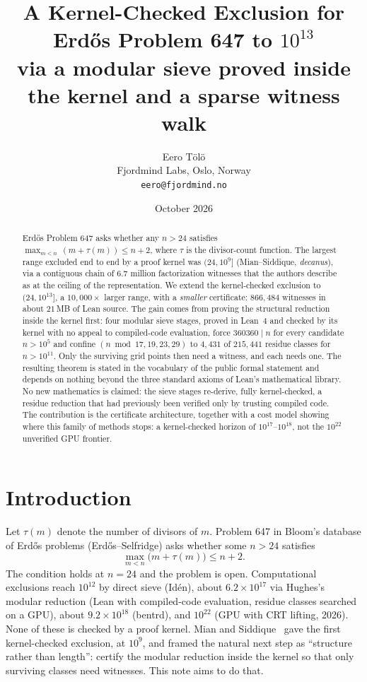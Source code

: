 \documentclass[11pt]{article}
\title{A Kernel-Checked Exclusion for Erd\H{o}s Problem 647 to $10^{13}$\\
\large via a modular sieve proved inside the kernel and a sparse witness walk}
\author{Eero T\"ol\"o\\ Fjordmind Labs, Oslo, Norway\\ \texttt{eero@fjordmind.no}}
\date{October 2026}
\begin{document}
\maketitle

\begin{abstract}
Erd\H{o}s Problem 647 asks whether any $n>24$ satisfies $\max_{m<n}\,(m+\tau(m))\le n+2$, where $\tau$ is the divisor-count function. The largest range excluded end to end by a proof kernel was $(24,10^{9}]$ (Mian--Siddique, \emph{decanus}), via a contiguous chain of $6.7$ million factorization witnesses that the authors describe as at the ceiling of the representation. We extend the kernel-checked exclusion to $(24,10^{13}]$, a $10{,}000\times$ larger range, with a \emph{smaller} certificate: $866{,}484$ witnesses in about $21$\,MB of Lean source. The gain comes from proving the structural reduction inside the kernel first: four modular sieve stages, proved in Lean~4 and checked by its kernel with no appeal to compiled-code evaluation, force $360360\mid n$ for every candidate $n>10^{5}$ and confine $(n \bmod 17,19,23,29)$ to $4{,}431$ of $215{,}441$ residue classes for $n>10^{11}$. Only the surviving grid points then need a witness, and each needs one. The resulting theorem is stated in the vocabulary of the public formal statement and depends on nothing beyond the three standard axioms of Lean's mathematical library. No new mathematics is claimed: the sieve stages re-derive, fully kernel-checked, a residue reduction that had previously been verified only by trusting compiled code. The contribution is the certificate architecture, together with a cost model showing where this family of methods stops: a kernel-checked horizon of $10^{17}$--$10^{18}$, not the $10^{22}$ unverified GPU frontier.
\end{abstract}

\section{Introduction}

Let $\tau(m)$ denote the number of divisors of $m$. Problem 647 in Bloom's database of Erd\H{o}s problems (Erd\H{o}s--Selfridge) asks whether some $n>24$ satisfies
\[
\max_{m<n}\bigl(m+\tau(m)\bigr)\le n+2 .
\]
The condition holds at $n=24$ and the problem is open. Computational exclusions reach $10^{12}$ by direct sieve (Id\'en), about $6.2\times10^{17}$ via Hughes's modular reduction (Lean with compiled-code evaluation, residue classes searched on a GPU), about $9.2\times10^{18}$ (bentrd), and $10^{22}$ (GPU with CRT lifting, 2026). None of these is checked by a proof kernel. Mian and Siddique~\cite{decanus} gave the first kernel-checked exclusion, at $10^{9}$, and framed the natural next step as ``structure rather than length'': certify the modular reduction inside the kernel so that only surviving classes need witnesses. This note aims to do that.
\end{document}
